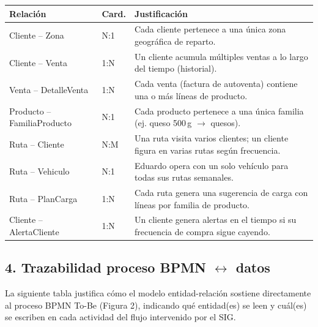 \documentclass[10pt,a4paper]{article}
\begin{document}
\vspace{0.15cm}
\begin{center}
\small
\renewcommand{\arraystretch}{1.25}
\begin{tabular}{|p{4.2cm}|p{1.8cm}|p{8.8cm}|}
\hline
\textbf{Relación} & \textbf{Card.} & \textbf{Justificación} \\ \hline
Cliente -- Zona & N:1 & Cada cliente pertenece a una única zona geográfica de reparto. \\ \hline
Cliente -- Venta & 1:N & Un cliente acumula múltiples ventas a lo largo del tiempo (historial). \\ \hline
Venta -- DetalleVenta & 1:N & Cada venta (factura de autoventa) contiene una o más líneas de producto. \\ \hline
Producto -- FamiliaProducto & N:1 & Cada producto pertenece a una única familia (ej. queso 500\,g $\rightarrow$ quesos). \\ \hline
Ruta -- Cliente & N:M & Una ruta visita varios clientes; un cliente figura en varias rutas según frecuencia. \\ \hline
Ruta -- Vehiculo & N:1 & Eduardo opera con un solo vehículo para todas sus rutas semanales. \\ \hline
Ruta -- PlanCarga & 1:N & Cada ruta genera una sugerencia de carga con líneas por familia de producto. \\ \hline
Cliente -- AlertaCliente & 1:N & Un cliente genera alertas en el tiempo si su frecuencia de compra sigue cayendo. \\ \hline
\end{tabular}
\end{center}
\vspace{0.2cm}

\subsection*{4. Trazabilidad proceso BPMN $\leftrightarrow$ datos}

La siguiente tabla justifica cómo el modelo entidad-relación sostiene directamente
al proceso BPMN To-Be (Figura 2), indicando qué entidad(es) se leen y cuál(es)
se escriben en cada actividad del flujo intervenido por el SIG.
\end{document}
